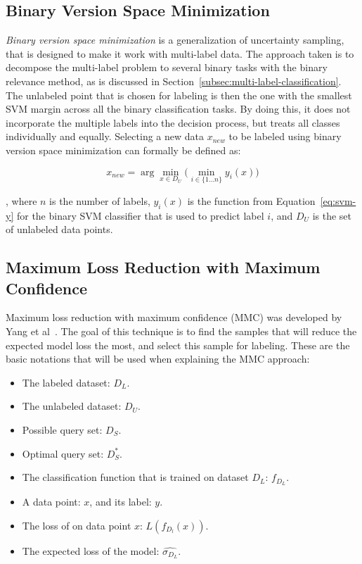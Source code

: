 \subsection{Binary Version Space Minimization}\label{subsec:binmin}

\textit{Binary version space minimization} is a generalization of uncertainty sampling, that is designed to make it work with multi-label data.
The approach taken is to decompose the multi-label problem to several binary tasks with the binary relevance method, as is discussed in Section~\ref{subsec:multi-label-classification}.
The unlabeled point that is chosen for labeling is then the one with the smallest SVM margin across all the binary classification tasks.
By doing this, it does not incorporate the multiple labels into the decision process, but treats all classes individually and equally. 
Selecting a new data $x_{new}$ to be labeled using binary version space minimization can formally be defined as:

\begin{equation}
    x_{new} = \arg\min_{x \in D_U} \big( \min_{i \in \{1 \dots n\}} y_i(x) \big)
\end{equation}

, where $n$ is the number of labels, $y_i(x)$ is the function from Equation~\ref{eq:svm-y} for the binary SVM classifier that is used to predict label $i$, and $D_U$ is the set of unlabeled data points.

\subsection{Maximum Loss Reduction with Maximum Confidence}\label{subsec:mmc}

Maximum loss reduction with maximum confidence (MMC) was developed by Yang et al~\cite{yang2009effective}.
The goal of this technique is to find the samples that will reduce the expected model loss the most, and select this sample for labeling.
These are the basic notations that will be used when explaining the MMC approach:
\begin{itemize}
    \item The labeled dataset: $D_L$.
    \item The unlabeled dataset: $D_U$.
    \item Possible query set: $D_S$.
    \item Optimal query set: $D^*_S$.
    \item The classification function that is trained on dataset $D_L$: $f_{D_L}$.
    \item A data point: $x$, and its label: $y$.
    \item The loss of on data point $x$: $L(f_{D_l}(x))$.
    \item The expected loss of the model: $\widehat{\sigma_{D_L}}$.
\end{itemize}

